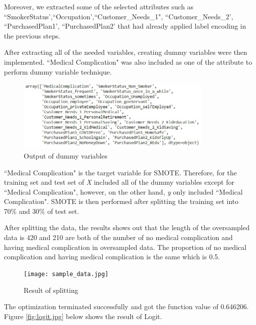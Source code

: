 \documentclass[11pt]{article}
\begin{document}
Moreover, we extracted some of the selected attributes such as ``SmokerStatus',``Occupation',``Customer\_Needs\_1", ``Customer\_Needs\_2', ``PurchasedPlan1', ``PurchasedPlan2' that had already applied label encoding in the previous steps. \vspace{0.3cm} 

After extracting all of the needed variables, creating dummy variables were then implemented. ``Medical Complication" was also included as one of the attribute to perform dummy variable technique.\vspace{0.3cm} 

 \begin{figure}[H]
     \centering
     \includegraphics[width=0.85\textwidth]{dummy.jpg}
     \caption{Output of dummy variables}
     \label{fig:dummy.jpg}
 \end{figure}

``Medical Complication" is the target variable for SMOTE. Therefore, for the training set and test set of \emph X included all of the dummy variables except for ``Medical Complication", however, on the other hand, \emph y only included ``Medical Complication". SMOTE is then performed after splitting the training set into 70\% and 30\% of test set. \vspace{0.3cm} 

After splitting the data, the results shows out that the length of the oversampled data is 420 and 210 are both of the number of no medical complication and having medical complication in oversampled data. The proportion of no medical complication and having medical complication is the same which is 0.5. 


 \begin{figure}[H] 
     \centering
     \texttt{[image: sample\_data.jpg]}
     \caption{Result of splitting}
     \label{fig:sample_data.jpg}
 \end{figure}

The optimization terminated successfully and got the function value of 0.646206. Figure \ref{fig:logit.jpg} below shows the result of Logit.
\end{document}
